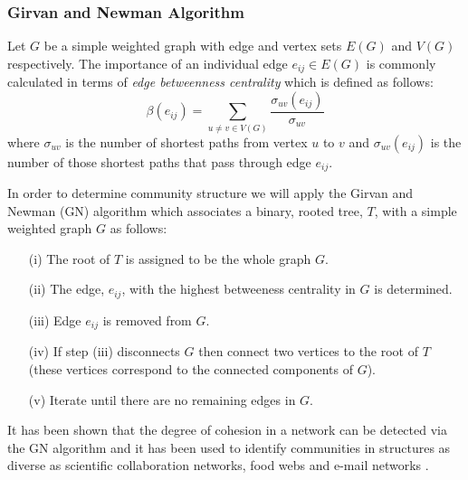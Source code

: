 \documentclass{sig-alternate}
\begin{document}
%

%
%
\begin{appendices}
\appendix
\subsubsection{Girvan and Newman Algorithm}

Let $G$ be a simple weighted graph with edge and vertex sets $E(G)$ and $V(G)$  respectively.  The importance of an individual edge $e_{ij} \in E(G)$ is commonly calculated in terms of \emph{edge betweenness centrality} which is defined as follows:
\[\beta(e_{ij}) = \sum_{ u\neq v \in V(G)} \frac{\sigma_{uv}(e_{ij})}{\sigma_{uv}}\]
where $\sigma_{uv}$ is the number of shortest paths from vertex $u$ to $v$ and $\sigma_{uv}(e_{ij})$ is the number of those shortest paths that pass through edge $e_{ij}$.  

In order to determine community structure we will apply the Girvan and Newman (GN) algorithm \cite{gnm:comm} which associates a binary, rooted tree, $T$, with a simple weighted graph $G$ as follows: 
\begin{itemize}
\item[(i)] The root of $T$ is assigned to be the whole graph $G$.
 \item[(ii)] The edge, $e_{ij}$, with the highest betweeness centrality in $G$ is determined.
 \item[(iii)] Edge $e_{ij}$ is removed from $G$.
 \item[(iv)] If step (iii) disconnects $G$ then connect two vertices to the root of $T$ (these  vertices correspond to the connected components of $G$).
 \item[(v)] Iterate until there are no remaining edges in $G$.
\end{itemize}

It has been shown \cite{gnm:comm} that the degree of cohesion in a network can be detected via the GN algorithm and it has been used to identify communities in structures as diverse as scientific collaboration networks, food webs and e-mail networks   \cite{gnm:comm,guimera:comm}.
\end{appendices}

\balancecolumns %
\end{document}
